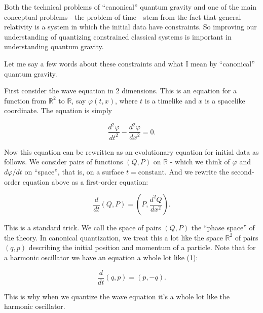 \documentclass{article}
\def\tightlist{}
\renewcommand{\texttt}[1]{%
  \begingroup
  \ttfamily
  \begingroup\lccode`~=`/\lowercase{\endgroup\def~}{/\discretionary{}{}{}}%
  \begingroup\lccode`~=`[\lowercase{\endgroup\def~}{[\discretionary{}{}{}}%
  \begingroup\lccode`~=`.\lowercase{\endgroup\def~}{.\discretionary{}{}{}}%
  \catcode`/=\active\catcode`[=\active\catcode`.=\active
  \scantokens{#1\noexpand}%
  \endgroup
}
\begin{document}

Both the technical problems of ``canonical'' quantum gravity and one of
the main conceptual problems - the problem of time - stem from the fact
that general relativity is a system in which the initial data have
constraints. So improving our understanding of quantizing constrained
classical systems is important in understanding quantum gravity.

Let me say a few words about these constraints and what I mean by
``canonical'' quantum gravity.

First consider the wave equation in 2 dimensions. This is an equation
for a function from \(\mathbb{R}^2\) to \(\mathbb{R}\), say
\(\varphi(t,x)\), where \(t\) is a timelike and \(x\) is a spacelike
coordinate. The equation is simply

\[\frac{d^2\varphi}{dt^2} - \frac{d^2\varphi}{dx^2} = 0.\]

Now this equation can be rewritten as an evolutionary equation for
initial data as follows. We consider pairs of functions \((Q,P)\) on
\(\mathbb{R}\) - which we think of \(\varphi\) and \(d\varphi/dt\) on
``space'', that is, on a surface \(t = \text{constant}\). And we rewrite
the second-order equation above as a first-order equation:

\[\frac{d}{dt}(Q,P) = \left(P,\frac{d^2Q}{dx^2}\right).\tag{1}\]

This is a standard trick. We call the space of pairs \((Q,P)\) the
``phase space'' of the theory. In canonical quantization, we treat this
a lot like the space \(\mathbb{R}^2\) of pairs \((q,p)\) describing the
initial position and momentum of a particle. Note that for a harmonic
oscillator we have an equation a whole lot like (1):

\[\frac{d}{dt}(q,p) = (p,-q).\]

This is why when we quantize the wave equation it's a whole lot like the
harmonic oscillator.
\end{document}
